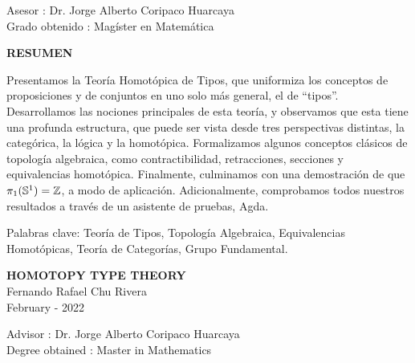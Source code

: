 \documentclass[12pt]{report}
\theoremstyle{definition}
\theoremstyle{plain}
\begin{document}
\noindent Asesor \hspace{1.74cm} : Dr. Jorge Alberto Coripaco Huarcaya \\
Grado obtenido \hspace{0.1cm} : Mag\'ister en Matem\'atica \\[1cm]

\vspace{1.5cm}

\begin{center}
    \textbf{RESUMEN}\\[1cm]
\end{center}

\noindent Presentamos la Teor\'ia Homot\'opica de Tipos, que uniformiza los conceptos de proposiciones y de conjuntos en uno solo m\'as general, el de ``tipos''.
Desarrollamos las nociones principales de esta teor\'ia, y observamos que esta tiene una profunda estructura, que puede ser vista desde tres perspectivas distintas, la categ\'orica, la l\'ogica y la homot\'opica. Formalizamos algunos conceptos cl\'asicos de topolog\'ia algebraica, como contractibilidad, retracciones, secciones y equivalencias homot\'opica.
Finalmente, culminamos con una demostraci\'on de que $\pi_1(\mathbb{S}^1)=\mathbb{Z}$, a modo de aplicaci\'on.
Adicionalmente, comprobamos todos nuestros resultados a trav\'es de un asistente de pruebas, Agda.

\vspace{1cm}
\noindent Palabras clave: Teor\'ia de Tipos, Topolog\'ia Algebraica, Equivalencias Homot\'opicas, Teor\'ia de Categor\'ias, Grupo Fundamental.



\newpage
{}
\begin{center}
    \textbf{HOMOTOPY TYPE THEORY} \\[0.4cm]
    Fernando Rafael Chu Rivera \\[0.4cm]
    February - 2022 \\[0.7cm]
\end{center}

\noindent Advisor \hspace{1.64cm} : Dr. Jorge Alberto Coripaco Huarcaya \\
Degree obtained \hspace{0.1cm} : Master in Mathematics \\[1cm]

\vspace{1.5cm}
\end{document}
